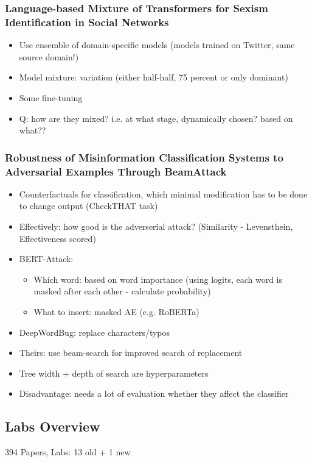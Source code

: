 \documentclass[a4paper]{article}
\begin{document}
\subsubsection{Language-based Mixture of Transformers for Sexism Identification in Social Networks}
\begin{itemize}
    \item Use ensemble of domain-specific models (models trained on Twitter, same source domain!)
    \item Model mixture: variation (either half-half, 75 percent or only dominant)
    \item Some fine-tuning
    \item Q: how are they mixed? i.e. at what stage, dynamically chosen? based on what??
\end{itemize}
\subsubsection{Robustness of Misinformation Classification Systems to Adversarial Examples Through BeamAttack}
\begin{itemize}
    \item Counterfactuals for classification, which minimal modification has to be done to change output (CheckTHAT task)
    \item Effectively: how good is the adverserial attack? (Similarity - Levensthein, Effectiveness scored)
    \item BERT-Attack:
          \begin{itemize}
              \item Which word: based on word importance (using logits, each word is masked after each other - calculate probability)
              \item What to insert: masked AE (e.g. RoBERTa)
          \end{itemize}
    \item DeepWordBug: replace characters/typos
    \item Theirs: use beam-search for improved search of replacement
    \item Tree width + depth of search are hyperparameters
    \item Disadvantage: needs a lot of evaluation whether they affect the classifier
\end{itemize}
\subsection{Labs Overview}
394 Papers, Labs: 13 old + 1 new
\end{document}
